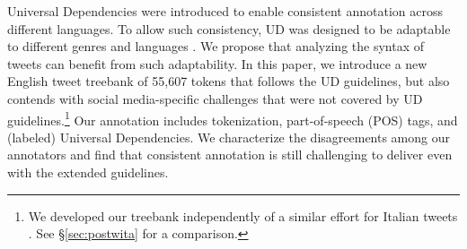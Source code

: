 \documentclass[11pt,a4paper]{article}
\newcommand{\yjcomment}[1]{\textcolor{orange}{[$_\mathrm{L}^\mathrm{Y}$#1]}}
\newcommand{\nascomment}[1]{\textcolor{blue}{[#1 ---\textsc{nas}]}}
\begin{document}

Universal Dependencies \citep[UD]{NIVRE16.348} were introduced to enable
consistent annotation across different languages. To allow such
consistency, UD was designed to be adaptable to different genres \cite{wang-EtAl:2017:Long6} 
and languages \cite{guo-EtAl:2015:ACL-IJCNLP2,TACL892}. We propose that analyzing
the syntax of tweets can benefit from such adaptability. In this paper,
we introduce a new English tweet treebank of 55,607 tokens that follows the UD
guidelines, but also contends with social media-specific challenges that were not
covered by UD guidelines.\footnote{We developed our treebank independently of a similar effort for Italian tweets \cite{sanguinetti-17}. 
See \S\ref{sec:postwita} for a comparison.} Our annotation includes 
tokenization, part-of-speech (POS) tags, and (labeled) Universal Dependencies.
We characterize the disagreements among our annotators and find that
consistent annotation is still challenging to deliver even with
the extended guidelines.

\end{document}
